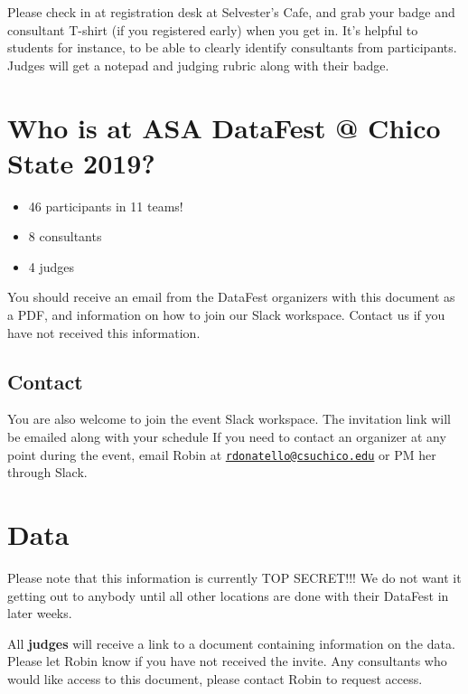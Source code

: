 \documentclass[]{article}
\providecommand{\tightlist}{%
  \setlength{\itemsep}{0pt}\setlength{\parskip}{0pt}}
\begin{document}
Please check in at registration desk at Selvester's Cafe, and grab your
badge and consultant T-shirt (if you registered early) when you get in.
It's helpful to students for instance, to be able to clearly identify
consultants from participants. Judges will get a notepad and judging
rubric along with their badge.

\hypertarget{who-is-at-asa-datafest-chico-state-2019}{%
\section{Who is at ASA DataFest @ Chico State
2019?}\label{who-is-at-asa-datafest-chico-state-2019}}

\begin{itemize}
\tightlist
\item
  46 participants in 11 teams!
\item
  8 consultants
\item
  4 judges
\end{itemize}

You should receive an email from the DataFest organizers with this
document as a PDF, and information on how to join our Slack workspace.
Contact us if you have not received this information.

\hypertarget{contact}{%
\subsection{Contact}\label{contact}}

You are also welcome to join the event Slack workspace. The invitation
link will be emailed along with your schedule If you need to contact an
organizer at any point during the event, email Robin at
\href{mailto:rdonatello@csuchico.edu}{\nolinkurl{rdonatello@csuchico.edu}}
or PM her through Slack.

\hypertarget{data}{%
\section{Data}\label{data}}

{Please note that this information is currently TOP SECRET!!!} We do not
want it getting out to anybody until all other locations are done with
their DataFest in later weeks.

All \textbf{judges} will receive a link to a document containing
information on the data. Please let Robin know if you have not received
the invite. Any consultants who would like access to this document,
please contact Robin to request access.
\end{document}

